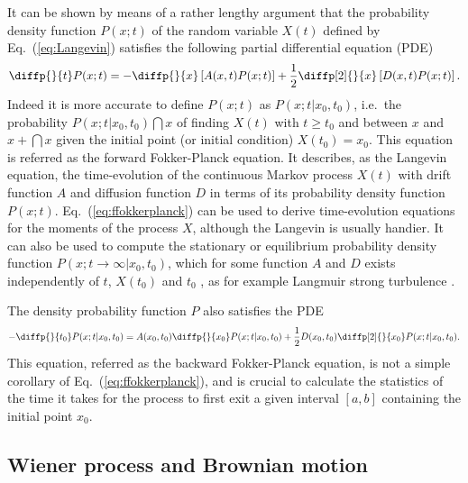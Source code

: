 \documentclass[10pt,a4paper]{article}
\newcommand{\eq}[1]{Eq.~(\ref{#1})}
\newcommand{\PDE}{\renewcommand{\PDE}{PDE\xspace}partial differential equation (PDE)\xspace}
\begin{document}
It can be shown by means of a rather lengthy argument that the probability
density function $P(x;t)$ of the random variable $X(t)$ defined by
\eq{eq:Langevin} satisfies the following \PDE \citep{gillespie:1996a}
\begin{align}
\diffp{}{t}P(x;t) = -\diffp{}{x}\left[A(x,t)P(x;t)\right]
+\frac{1}{2}\diffp[2]{}{x}\left[D(x,t)P(x;t)\right].
\label{eq:ffokkerplanck}
\end{align}
Indeed it is more accurate to define $P(x;t)$ as 
$P(x;t|x_0,t_0)$, i.e.\ the probability $P(x;t|x_0, t_0)\dint{x}$ of finding 
$X(t)$ with $t\geq t_0$ and between $x$ and $x{+}\dint{x}$ given the initial 
point (or initial condition) $X(t_0)=x_0$.
This equation is referred as the forward Fokker-Planck equation. It describes,
as the Langevin equation, the time-evolution of the continuous Markov process
$X(t)$ with drift function $A$ and diffusion function $D$ in terms of its
probability density function $P(x;t)$.
\eq{eq:ffokkerplanck} can be used to derive time-evolution equations for the
moments of the process $X$, although the Langevin is usually handier. 
It can also be used to compute the stationary or equilibrium probability
density function $P(x;t\rightarrow\infty|x_0, t_0)$, which for some
function $A$ and $D$ exists independently of $t$, $X(t_0)$ and $t_0$
\citep{gillespie:1996c}, as for example Langmuir strong turbulence
\citep{guio:2006,isham:2012}.

The density probability function $P$ also satisfies the \PDE
\begin{align}
-\diffp{}{{t_0}}P(x;t|x_0, t_0) = A(x_0,t_0)\diffp{}{{x_0}}P(x;t|x_0, t_0)
+\frac{1}{2}D(x_0,t_0)\diffp[2]{}{{x_0}}P(x;t|x_0, t_0).
\label{eq:bfokkerplanck}
\end{align}
This equation, referred as the backward Fokker-Planck equation, is not a
simple corollary of \eq{eq:ffokkerplanck}, and is crucial to calculate the
statistics of the time it takes for the process to first exit a given
interval $[a,b]$ containing the initial point $x_0$.


\subsection{Wiener process and Brownian motion}
\end{document}
